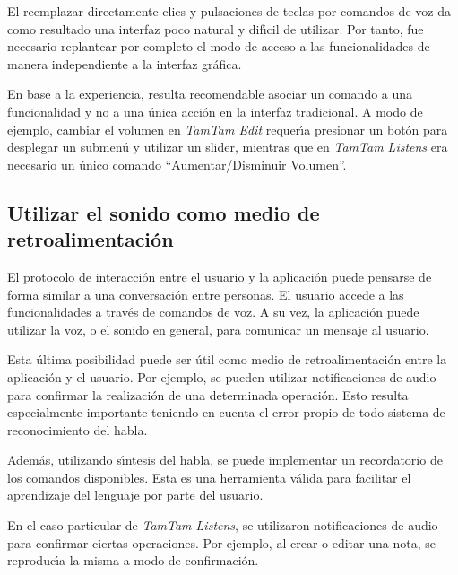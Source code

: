 El reemplazar directamente clics y pulsaciones de teclas por comandos de voz da
como resultado una interfaz poco natural y dif{\'\i}cil de utilizar. Por tanto, fue
necesario replantear por completo el modo de acceso a las funcionalidades de manera
independiente a la interfaz gr\'afica.

En base a la experiencia, resulta recomendable asociar un comando a una funcionalidad
y no a una \'unica acci\'on en la interfaz tradicional. A modo de ejemplo, cambiar el
volumen en \emph{TamTam Edit} requer{\'\i}a presionar un bot\'on para desplegar un submen\'u 
y utilizar un {slider}, mientras que en \emph{TamTam Listens} era necesario un
\'unico comando ``Aumentar/Disminuir Volumen''.

\subsection{Utilizar el sonido como medio de retroalimentaci\'on}
El protocolo de interacci\'on entre el usuario y la aplicaci\'on puede pensarse de forma similar a una 
conversaci\'on entre personas. El usuario accede a las funcionalidades a trav\'es de comandos de voz.
A su vez, la aplicaci\'on puede utilizar la voz, o el sonido en general, para comunicar un mensaje al usuario.

Esta \'ultima posibilidad puede ser \'util como medio de retroalimentaci\'on entre la aplicaci\'on y el usuario.
Por ejemplo, se pueden utilizar notificaciones de audio para confirmar la realizaci\'on de una determinada
operaci\'on. Esto resulta especialmente importante teniendo en cuenta el error propio de todo sistema
de reconocimiento del habla.

Adem\'as, utilizando s{\'\i}ntesis del habla, se puede implementar un recordatorio de los comandos
disponibles. Esta es una herramienta v\'alida para facilitar el aprendizaje del lenguaje por parte del
usuario.

En el caso particular de \emph{TamTam Listens}, se utilizaron notificaciones de audio para confirmar
ciertas operaciones. Por ejemplo, al crear o editar una nota, se reproduc{\'\i}a la misma a modo de
confirmaci\'on.


